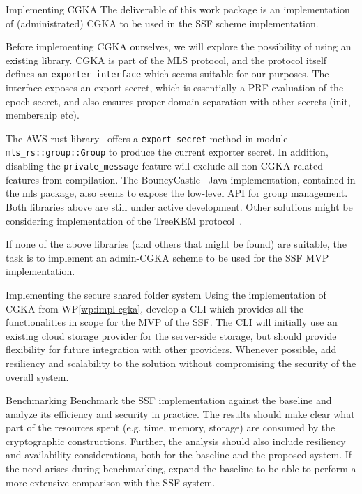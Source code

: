 \documentclass[E]{BAMASA}
\begin{document}
\begin{workpackage}{Implementing CGKA}\label{wp:impl-cgka}
	The deliverable of this work package is an implementation of (administrated) CGKA to be used in the SSF scheme implementation.
	
    Before implementing CGKA ourselves, we will explore the possibility of using an existing library.
    CGKA is part of the MLS protocol, and the protocol itself defines an \texttt{exporter interface} which seems suitable for our purposes. 
    The interface exposes an export secret, which is essentially a PRF evaluation of the epoch secret, and also ensures proper domain separation with other secrets (init, membership etc).

    The AWS rust library~\cite{AWSMLSrs} offers a \texttt{export\_secret} method in module 
    \texttt{mls\_rs::group::Group} to produce the current exporter secret. In addition, disabling the \texttt{private\_message} feature 
    will exclude all non-CGKA related features from compilation.
The BouncyCastle~\cite{BouncyCastle} Java implementation, contained in the mls package, also seems to expose the
    low-level API for group management.
    Both libraries above are still under active development. Other solutions might be considering
    implementation of the TreeKEM protocol~\cite{TreeKEMimpl}.

    If none of the above libraries (and others that might be found) are suitable, the task is to implement an admin-CGKA scheme to be used for the SSF MVP implementation.
\end{workpackage}

\begin{workpackage}{Implementing the secure shared folder system}\label{wp:impl-ssf}
    Using the implementation of CGKA from WP\ref{wp:impl-cgka}, develop a CLI which provides all the functionalities in scope for the MVP of the SSF.
    The CLI will initially use an existing cloud storage provider for the server-side storage, but should provide flexibility for future integration with other providers. 
    Whenever possible, add resiliency and scalability to the solution without
    compromising the security of the overall system.
\end{workpackage}

\begin{workpackage}{Benchmarking}\label{wp:benchmark}
	Benchmark the SSF implementation against the baseline and analyze its efficiency and security in practice. 
    The results should make clear what part of the resources spent (e.g. time, memory, storage) 
    are consumed by the cryptographic constructions. Further, the analysis should also include
    resiliency and availability considerations, both for the baseline and the proposed system.  
    If the need arises during benchmarking, expand the baseline to be able to perform a more
    extensive comparison with the SSF system.
\end{workpackage}
\end{document}
